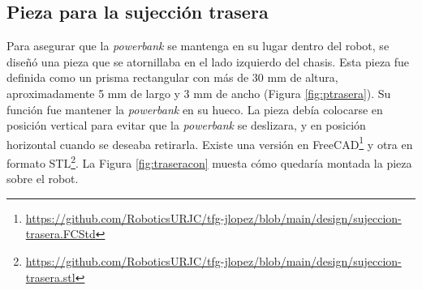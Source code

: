 \subsection{Pieza para la sujección trasera}

Para asegurar que la \textit{powerbank} se mantenga en su lugar dentro del robot, se diseñó una pieza que se atornillaba en el lado izquierdo del chasis. Esta pieza fue definida como un prisma rectangular con más de 30 mm de altura, aproximadamente 5 mm de largo y 3 mm de ancho (Figura \ref{fig:ptrasera}). Su función fue mantener la \textit{powerbank} en su hueco. La pieza debía colocarse en posición vertical para evitar que la \textit{powerbank} se deslizara, y en posición horizontal cuando se deseaba retirarla. Existe una versión en FreeCAD\footnote{\url{https://github.com/RoboticsURJC/tfg-jlopez/blob/main/design/sujeccion-trasera.FCStd}} y otra en formato STL\footnote{\url{https://github.com/RoboticsURJC/tfg-jlopez/blob/main/design/sujeccion-trasera.stl}}. La Figura \ref{fig:traseracon} muesta cómo quedaría montada la pieza sobre el robot.

